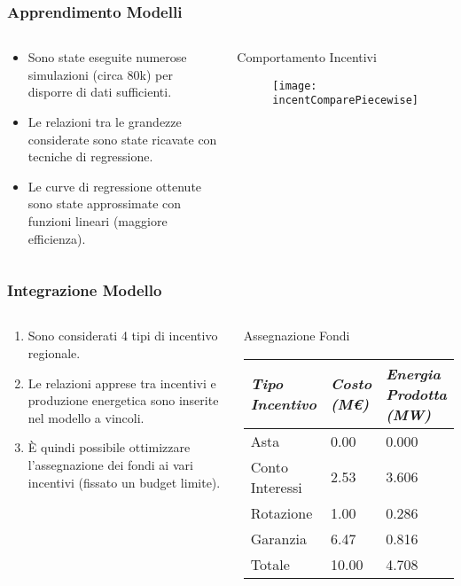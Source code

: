 \documentclass{beamer}
\begin{document}
	\begin{frame}
		\frametitle{Apprendimento Modelli}
		\begin{columns}
		\begin{block}{}
			\begin{itemize}
				\item Sono state eseguite numerose simulazioni (circa 80k) per disporre di dati sufficienti.
				\item Le relazioni tra le grandezze considerate sono state ricavate con tecniche di regressione.
				\item Le curve di regressione ottenute sono state approssimate con funzioni lineari (maggiore efficienza).
			\end{itemize}
		\end{block}
		\begin{block}{Comportamento Incentivi}
			\begin{figure}[hbt]
				\centering
				\texttt{[image: incentComparePiecewise]}
				\label{incentComparePiecewise}
			\end{figure}
		\end{block}
		\end{columns}
  	\end{frame}
  	\begin{frame}
		\frametitle{Integrazione Modello}
		\begin{columns}
		\column{.45\textwidth}
		\begin{block}{}
			\begin{enumerate}
				\item Sono considerati 4 tipi di incentivo regionale.
				\item Le relazioni apprese tra incentivi e produzione energetica sono inserite nel modello a vincoli.
				\item \`E quindi possibile ottimizzare l'assegnazione dei fondi ai vari incentivi (fissato un budget limite).
			\end{enumerate}
		\end{block}
		\column{.55\textwidth}
		\begin{block}{Assegnazione Fondi}
			\begin{table}[h]
				\centering
				\begin{tabular}{ p{}  | p{0.15\textwidth} | p{}  }
					\hline \hline 
					\nohyphens{\emph{Tipo Incentivo}} & \nohyphens{\emph{Costo (M\euro)}} & \nohyphens{\emph{Energia Prodotta (MW)}} \\ \hline
					Asta &  0.00 & 0.000 \\ 
					\nohyphens{Conto Interessi} & 2.53 & 3.606 \\ 
					Rotazione & 1.00 & 0.286 \\ 
					Garanzia & 6.47 & 0.816 \\ \hline 
					Totale & 10.00 & 4.708 \\
					\hline \hline 
				\end{tabular}
				\label{tab:assegnFondi10M}	
			\end{table}
		\end{block}
		\end{columns}
  	\end{frame}
  
\end{document}
